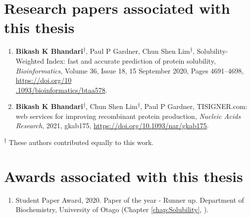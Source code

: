 \section*{Research papers associated with this thesis}
\begin{enumerate}
	\item \textbf{Bikash K Bhandari}\textsuperscript{$\dagger$}, Paul P Gardner, Chun Shen Lim\textsuperscript{$\dagger$}, Solubility-Weighted Index: fast and accurate prediction of protein solubility, \textit{Bioinformatics}, Volume 36, Issue 18, 15 September 2020, Pages 4691–4698, \href{https://doi.org/10.1093/bioinformatics/btaa578}{https://doi.org/10\\.1093/bioinformatics/btaa578}.
	
	
	\item \textbf{Bikash K Bhandari}\textsuperscript{$\dagger$}, Chun Shen Lim\textsuperscript{$\dagger$}, Paul P Gardner, TISIGNER.com: web services for improving recombinant protein production, \textit{Nucleic Acids Research}, 2021, gkab175, \href{https://doi.org/10.1093/nar/gkab175}{https://doi.org/10.1093/nar/gkab175}.
	
\end{enumerate}

\textsuperscript{$\dagger$} These authors contributed equally to this work.



\section*{Awards associated with this thesis}
\begin{enumerate}
	\item Student Paper Award, 2020. Paper of the year - Runner up. Department of Biochemistry, University of Otago (Chapter \ref{chap:Solubility}, \cite{Bhandari2020-pz}).

\end{enumerate}